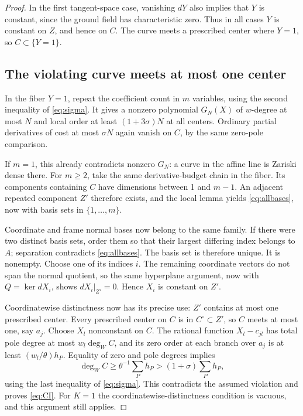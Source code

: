 \documentclass[11pt]{article}
\theoremstyle{definition}
\theoremstyle{remark}
\numberwithin{equation}{section}
\begin{document}
\begin{proof}
In the first tangent-space case, vanishing \(dY\) also implies that
\(Y\) is constant, since the ground field has characteristic zero.
Thus in all cases \(Y\) is constant on \(Z\), and hence on \(C\).
The curve meets a prescribed center where \(Y=1\), so \(C\subset\{Y=1\}\).

\subsection*{The violating curve meets at most one center}
In the fiber \(Y=1\), repeat the coefficient count in \(m\) variables,
using the second inequality of \eqref{eq:sigma}. It gives a nonzero
polynomial \(G_N(X)\) of \(w\)-degree at most \(N\) and local order
at least \((1+3\sigma)N\) at all centers. Ordinary partial derivatives
of cost at most \(\sigma N\) again vanish on \(C\), by the same
zero-pole comparison.

If \(m=1\), this already contradicts nonzero \(G_N\): a curve in
the affine line is Zariski dense there. For \(m\ge2\), take the
same derivative-budget chain in the fiber. Its components containing
\(C\) have dimensions between 1 and \(m-1\). An adjacent repeated
component \(Z'\) therefore exists, and the local lemma yields
\eqref{eq:allbases}, now with basis sets in \(\{1,\ldots,m\}\).

Coordinate and frame normal bases now belong to the same family.
If there were two distinct basis sets, order them so that their
largest differing index belongs to \(A\); separation contradicts
\eqref{eq:allbases}. The basis set is therefore unique. It is nonempty.
Choose one of its indices \(i\). The remaining coordinate vectors
do not span the normal quotient, so the same hyperplane argument,
now with \(Q=\ker dX_i\), shows \(dX_i|_{Z'}=0\). Hence \(X_i\)
is constant on \(Z'\).

Coordinatewise distinctness now has its precise use: \(Z'\) contains
at most one prescribed center. Every prescribed center on \(C\) is
in \(C^\circ\subset Z'\), so \(C\) meets at most one, say \(a_j\).
Choose \(X_l\) nonconstant on \(C\). The rational function
\(X_l-c_{jl}\) has total pole degree at most \(w_l\deg_W C\),
and its zero order at each branch over \(a_j\) is at least
\((w_l/\theta)h_P\). Equality of zero and pole degrees implies
\[
 \deg_W C\ge\theta^{-1}\sum_Ph_P
 >(1+\sigma)\sum_Ph_P,
\]
using the last inequality of \eqref{eq:sigma}. This contradicts the
assumed violation and proves \eqref{eq:CI}. For \(K=1\) the
coordinatewise-distinctness condition is vacuous, and this argument
still applies.
\end{proof}
\end{document}
